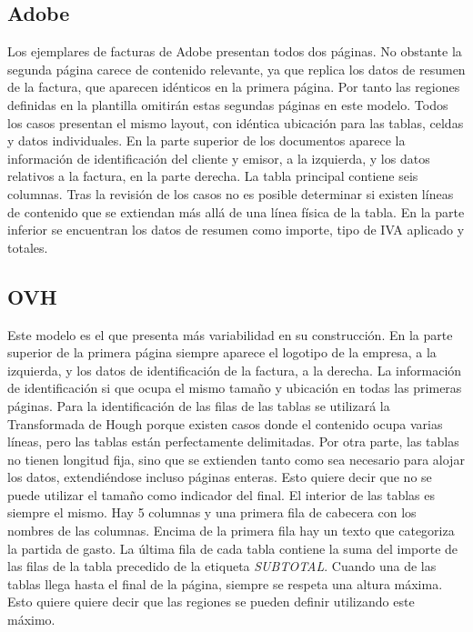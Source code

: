 \subsection{Adobe}

Los ejemplares de facturas de Adobe presentan todos dos páginas. No obstante la segunda página carece de contenido relevante, ya que replica los datos de resumen de la factura, que aparecen idénticos en la primera página. Por tanto las regiones definidas en la plantilla omitirán estas segundas páginas en este modelo.
Todos los casos presentan el mismo layout, con idéntica ubicación para las tablas, celdas y datos individuales. En la parte superior de los documentos aparece la información de identificación del cliente y emisor, a la izquierda, y los datos relativos a la factura, en la parte derecha.
La tabla principal contiene seis columnas. Tras la revisión de los casos no es posible determinar si existen líneas de contenido que se extiendan más allá de una línea física de la tabla.
En la parte inferior se encuentran los datos de resumen como importe, tipo de IVA aplicado y totales.

\subsection{OVH}

Este modelo es el que presenta más variabilidad en su construcción. En la parte superior de la primera página siempre aparece el logotipo de la empresa, a la izquierda, y los datos de identificación de la factura, a la derecha. La información de identificación si que ocupa el mismo tamaño y ubicación en todas las primeras páginas. Para la identificación de las filas de las tablas se utilizará la Transformada de Hough porque existen casos donde el contenido ocupa varias líneas, pero las tablas están perfectamente delimitadas. Por otra parte, las tablas no tienen longitud fija, sino que se extienden tanto como sea necesario para alojar los datos, extendiéndose incluso páginas enteras. Esto quiere decir que no se puede utilizar el tamaño como indicador del final. El interior de las tablas es siempre el mismo. Hay 5 columnas y una primera fila de cabecera con los nombres de las columnas. Encima de la primera fila hay un texto que categoriza la partida de gasto. La última fila de cada tabla contiene la suma del importe de las filas de la tabla precedido de la etiqueta \emph{SUBTOTAL}. Cuando una de las tablas llega hasta el final de la página, siempre se respeta una altura máxima. Esto quiere quiere decir que las regiones se pueden definir utilizando este máximo.

